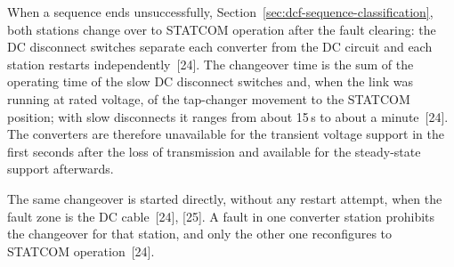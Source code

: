 When a sequence ends unsuccessfully, Section~\ref{sec:dcf-sequence-classification},
both stations change over to STATCOM operation after the fault clearing:
the DC disconnect switches separate each converter from the DC circuit and
each station restarts independently~[24]. The changeover time is the sum of
the operating time of the slow DC disconnect switches and, when the link was
running at rated voltage, of the tap-changer movement to the STATCOM
position; with slow disconnects it ranges from about 15\,s to about a
minute~[24]. The converters are therefore unavailable for the transient
voltage support in the first seconds after the loss of transmission and
available for the steady-state support afterwards.

The same changeover is started directly, without any restart attempt, when
the fault zone is the DC cable~[24], [25]. A fault in one converter station
prohibits the changeover for that station, and only the other one
reconfigures to STATCOM operation~[24].

\FloatBarrier
